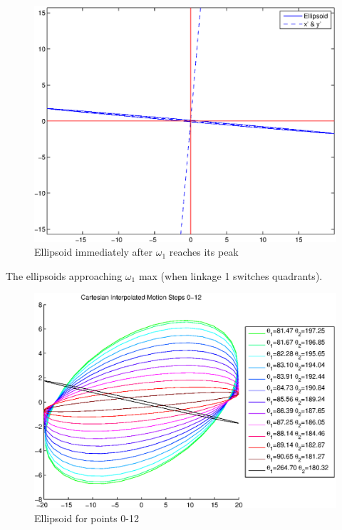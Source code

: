 \begin{figure}[H]
  \centering
    \includegraphics[height=.6\textwidth]{Ellipsoid1}
 \caption{Ellipsoid immediately after $\omega_1$ reaches its peak}
  \label{Ellipsoid1}
\end{figure}

The ellipsoids approaching $\omega_1$ max (when linkage 1 switches quadrants).
\begin{figure}[H]
  \centering
    \includegraphics[height=.6\textwidth]{Ellipsoid2}
 \caption{Ellipsoid for points 0-12}
  \label{Ellipsoid2}
\end{figure}